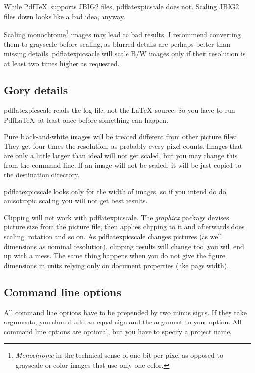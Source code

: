 \documentclass[10pt,a4paper]{article}
\begin{document}
While \label{section:monochrome}Pdf\TeX\ supports JBIG2 files,
pdflatexpicscale does not. Scaling JBIG2 files down looks like a bad idea,
anyway.

Scaling monochrome\footnote{\emph{Monochrome} in the technical sense of one
  bit per pixel as opposed to grayscale or color images that use only one
  color.}  images may lead to bad results. I recommend converting them to
grayscale before scaling, as blurred details are perhaps better than missing
details. pdflatexpicsacle will scale B/W images only if their resolution is at
least two times higher as requested.

\subsection{Gory details}

pdflatexpicscale reads the log file, not the \LaTeX\ source. So you have to
run Pdf\LaTeX\ at least once before something can happen.

Pure black-and-white images will be treated different from other picture
files: They get four times the resolution, as probably every pixel counts. 
Images that are only a little larger than ideal will not get scaled, but you
may change this from the command line.
If an image will not be scaled, it will be just copied to the destination
directory. 

pdflatexpicscale looks only for the width of images, so if you intend do do
anisotropic scaling you will not get best results. 

Clipping will not work with pdflatexpicscale. The \emph{graphicx} package
devises picture size from the picture file, then applies clipping to it and
afterwards does scaling, rotation and so on. As pdflatexpicscale changes
pictures (as well dimensions as nominal resolution), clipping results will
change too, you will end up with a mess. The same thing happens when you do
not give the figure dimensions in units relying only on document properties
(like page width). 

\subsection{Command line options}

All command line options have to be prepended by two minus signs. If they take
arguments, you should add an equal sign and the argument to your option. All
command line options are optional, but you have to specify a project name.
\end{document}
